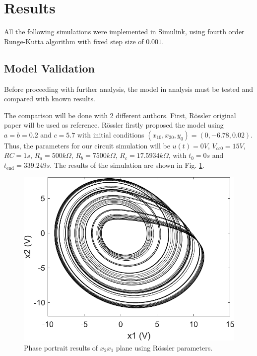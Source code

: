 

\section{Results}\label{sec:result}
All the following simulations were implemented in Simulink, using fourth order Runge-Kutta algorithm with fixed step size of $0.001$.
\subsection{Model Validation}
Before proceeding with further analysis, the model in analysis must be tested and compared with known results.

The comparison will be done with 2 different authors. First, R\"ossler original paper \cite[Fig. 2]{rossler1976equation} will be used as reference. R\"ossler firstly proposed the model using $a=b=0.2$ and $c=5.7$ with initial conditions $(x_{10},x_{20},y_{0})=(0,-6.78,0.02)$.
Thus, the parameters for our circuit simulation will be $u(t)=0V$, $V_{cc0}=15V$, $RC=1s$, $R_a=500k\Omega$, $R_b=7500k\Omega$, $R_c=17.5934k\Omega$, with $t_0=0s$ and $t_{\text{end}}=339.249s$. The results of the simulation are shown in Fig. \ref{fig:validRoss}.

\begin{figure}[H]
    \centering
    \includegraphics[scale=0.4]{figs/x1vsx2ValidRoss.pdf}
    \caption{Phase portrait results of $x_2x_1$ plane using R\"ossler \cite{rossler1976equation} parameters.}
    \label{fig:validRoss}
\end{figure}

